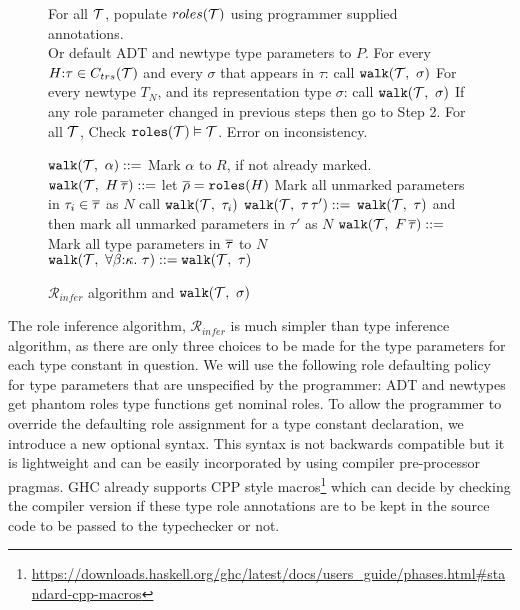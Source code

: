 \documentclass[screen,nonacm]{acmart}
\begin{document}
\newcommand\RoleInfer{$\mathcal{R}_{infer}$\xspace}
\newcommand\walk[2]{\texttt{walk}(#1,~#2)}
\begin{figure}[ht]
  \begin{algorithmic}[1]
    \Procedure{\RoleInfer}{[$\TypeConst$]}

    \State For all $\TypeConst$, populate $roles(\mathcal{T})$ using programmer supplied annotations. \\
    \qquad Or default ADT and newtype type parameters to $P$.
    \State For every $H{:}\tau \in C_{trs}(\mathcal{T})$ and every $\sigma$ that appears in $\tau$: call $\walk\TypeConst\sigma$\label{here}
    \State For every newtype $T_N$, and its representation type $\sigma$: call $\walk\TypeConst\sigma$
    \State If any role parameter changed in previous steps then go to Step 2.
    \State For all $\TypeConst$, Check $\texttt{roles}(\mathcal{T}) \mathrel{\vDash} \mathcal{T}$. Error on inconsistency.
    \EndProcedure
  \end{algorithmic}

  \begin{algorithmic}[1]
    \State $\walk \TypeConst {\alpha} \bnfeq$ Mark $\alpha$ to $R$, if not already marked.
    \State $\walk \TypeConst {H\App \many\tau} \bnfeq$ let $\overline{\rho} = \texttt{roles}(H)$
        \State Mark all unmarked parameters in $\tau_i \in \overline{\tau}$ as $N$
        \State call $\walk{\TypeConst}{\tau_i}$
    \EndIf
    \State $\walk \TypeConst {\tau\App\tau'} \bnfeq$ $\walk{\TypeConst}{\tau}$ and then mark all unmarked parameters in $\tau'$ as $N$
    \State $\walk \TypeConst {F\App\many\tau} \bnfeq$ Mark all type parameters in $\overline{\tau}$ to $N$
    \State $\walk \TypeConst {\Forall{\beta\co\kappa}\tau} \bnfeq \walk \TypeConst \tau$
    \EndProcedure
  \end{algorithmic}
\caption{\RoleInfer algorithm and $\walk\TypeConst\sigma$}\label{alg:role-infer}
\end{figure}

The role inference algorithm, \RoleInfer is much simpler than type inference algorithm, as there are only three choices to be made for the type parameters for each type constant in question. We will use the following role defaulting policy for type parameters that are unspecified by the programmer: ADT and newtypes get phantom roles type functions get nominal roles. To allow the programmer to override the defaulting role assignment for a type constant declaration, we introduce a new optional syntax.
This syntax is not backwards compatible but it is lightweight and can be easily incorporated by using compiler pre-processor pragmas. GHC already supports CPP style macros\footnote{\url{https://downloads.haskell.org/ghc/latest/docs/users\_guide/phases.html\#standard-cpp-macros}} which can decide by checking the compiler version if these type role annotations are to be kept in the source code to be passed to the typechecker or not.
\end{document}
